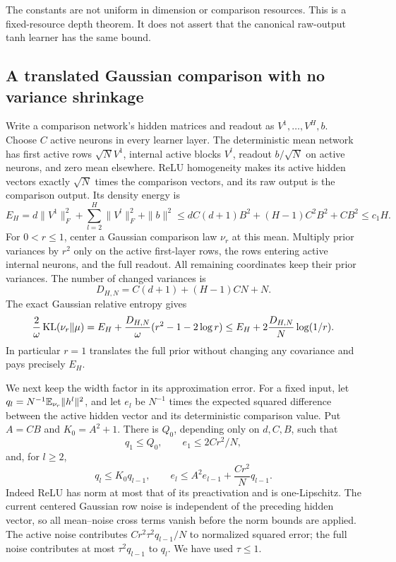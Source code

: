 The constants are not uniform in dimension or comparison resources. This is a fixed-resource depth theorem. It does not assert that the canonical raw-output tanh learner has the same bound.

\subsection{A translated Gaussian comparison with no variance shrinkage}
Write a comparison network's hidden matrices and readout as $V^1,\ldots,V^H,b$. Choose $C$ active neurons in every learner layer. The deterministic mean network has first active rows $\sqrt N V^1$, internal active blocks $V^l$, readout $b/\sqrt N$ on active neurons, and zero mean elsewhere. ReLU homogeneity makes its active hidden vectors exactly $\sqrt N$ times the comparison vectors, and its raw output is the comparison output.
Its density energy is
\begin{equation}
 E_H=d\|V^1\|_F^2+\sum_{l=2}^H\|V^l\|_F^2+\|b\|^2
 \le dC(d+1)B^2+(H-1)C^2B^2+CB^2
 \le c_1H.
 \label{eq:relu-mean-energy}
\end{equation}
For $0<r\le1$, center a Gaussian comparison law $\nu_r$ at this mean. Multiply prior variances by $r^2$ only on the active first-layer rows, the rows entering active internal neurons, and the full readout. All remaining coordinates keep their prior variances. The number of changed variances is
\[
 D_{H,N}=C(d+1)+(H-1)CN+N.
\]
The exact Gaussian relative entropy gives
\begin{equation}
 \frac{2}{\omega}\operatorname{KL}(\nu_r\Vert\mu)
 =E_H+\frac{D_{H,N}}{\omega}(r^2-1-2\log r)
 \le E_H+2\frac{D_{H,N}}N\log(1/r).
 \label{eq:relu-selective-entropy-depth}
\end{equation}
In particular $r=1$ translates the full prior without changing any covariance and pays precisely $E_H$.

We next keep the width factor in its approximation error. For a fixed input, let $q_l=N^{-1}\mathbb E_{\nu_r}\|h^l\|^2$, and let $e_l$ be $N^{-1}$ times the expected squared difference between the active hidden vector and its deterministic comparison value. Put $A=CB$ and $K_0=A^2+1$. There is $Q_0$, depending only on $d,C,B$, such that
\[
 q_1\le Q_0,\qquad e_1\le 2Cr^2/N,
\]
and, for $l\ge2$,
\begin{equation}
 q_l\le K_0 q_{l-1},\qquad
 e_l\le A^2e_{l-1}+\frac{Cr^2}{N}q_{l-1}.
 \label{eq:relu-depth-moments}
\end{equation}
Indeed ReLU has norm at most that of its preactivation and is one-Lipschitz. The current centered Gaussian row noise is independent of the preceding hidden vector, so all mean--noise cross terms vanish before the norm bounds are applied. The active noise contributes $Cr^2\tau^2q_{l-1}/N$ to normalized squared error; the full noise contributes at most $\tau^2q_{l-1}$ to $q_l$. We have used $\tau\le1$.

